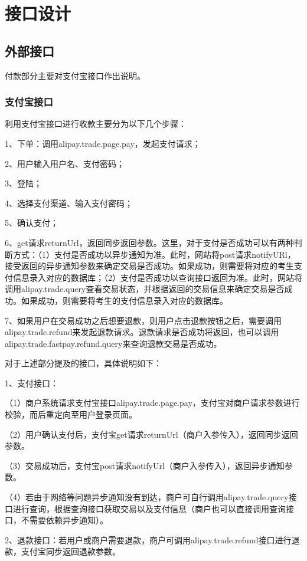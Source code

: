 \chapter{接口设计}
\section{外部接口}
付款部分主要对支付宝接口作出说明。

\subsection{支付宝接口}
利用支付宝接口进行收款主要分为以下几个步骤：

1、下单：调用alipay.trade.page.pay，发起支付请求；

2、用户输入用户名、支付密码；

3、登陆；

4、选择支付渠道、输入支付密码；

5、确认支付；

6、get请求returnUrl，返回同步返回参数。这里，对于支付是否成功可以有两种判断方式：（1）支付是否成功以异步通知为准。此时，网站将post请求notifyURl，接受返回的异步通知参数来确定交易是否成功。如果成功，则需要将对应的考生支付信息录入对应的数据库；（2）支付是否成功以查询接口返回为准。此时，网站将调用alipay.trade.query查看交易状态，并根据返回的交易信息来确定交易是否成功。如果成功，则需要将考生的支付信息录入对应的数据库。

7、如果用户在交易成功之后想要退款，则用户点击退款按钮之后，需要调用alipay.trade.refund来发起退款请求。退款请求是否成功将返回，也可以调用alipay.trade.fastpay.refund.query来查询退款交易是否成功。

对于上述部分提及的接口，具体说明如下：

1、支付接口：

（1）商户系统请求支付宝接口alipay.trade.page.pay，支付宝对商户请求参数进行校验，而后重定向至用户登录页面。

（2）用户确认支付后，支付宝get请求returnUrl（商户入参传入），返回同步返回参数。

（3）交易成功后，支付宝post请求notifyUrl（商户入参传入），返回异步通知参数。

（4）若由于网络等问题异步通知没有到达，商户可自行调用alipay.trade.query接口进行查询，根据查询接口获取交易以及支付信息（商户也可以直接调用查询接口，不需要依赖异步通知）。

2、退款接口：若用户或商户需要退款，商户可调用alipay.trade.refund接口进行退款，支付宝同步返回退款参数。 

